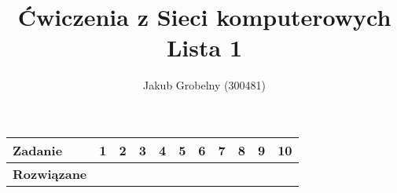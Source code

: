 \documentclass[a4paper, oneside]{article}
\title{\Large\textbf{Ćwiczenia z Sieci komputerowych\\ Lista 1}}
\author{Jakub Grobelny (300481)}
\date{}
\newcommand{\X}{\checkmark}
\begin{document}
\begin{titlepage}
    \maketitle
\end{titlepage}

\begin{table}[H]
    \centering
    \begin{tabular}{|l|c|c|c|c|c|c|c|c|c|c|}
    \hline
    \textbf{Zadanie}    & 1 & 2 & 3 & 4 & 5 & 6 & 7 & 8 & 9 & 10 \\\hline
    \textbf{Rozwiązane} &\X &\X &\X &\X &\X &\X &\X &   &   &    \\\hline
\end{tabular}
\end{table}
\end{document}
